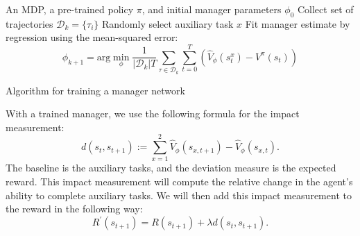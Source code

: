 \documentclass[12pt,A4]{report}
\theoremstyle{definition}
\begin{document}
\begin{algorithm}
\begin{algorithmic}[1]
\Require An MDP, a pre-trained policy $\pi$, and initial manager parameters $\phi_0$
  \State Collect set of trajectories $\mathcal{D}_k = \{\tau_i\}$
  \State Randomly select auxiliary task $x$
  \State Fit manager estimate by regression using the mean-squared error:
  \[ \phi_{k+1} = \text{arg} \min_\phi \frac{1}{|\mathcal{D}_k|T} \sum_{\tau \in \mathcal{D}_k} \sum_{t=0}^T \left( \hat{V}_\phi(s^x_t) - V^\pi (s_t) \right)\]
\EndFor
\end{algorithmic}
\caption{Algorithm for training a manager network}
  \label{alg:manager}
\end{algorithm}






With a trained manager, we use the following formula for the impact measurement:
\[ d(s_t,s_{t+1}) := \sum_{x=1}^2 \hat{V}_\phi(s_{x,t+1}) - \hat{V}_\phi(s_{x,t}).\]
The baseline is the auxiliary tasks, and the deviation measure is the expected reward. This impact measurement will compute the relative change in the agent's ability to complete auxiliary tasks. We will then add this impact measurement to the reward in the following way: 
\[ R^{\prime}(s_{t+1}) = R(s_{t+1}) + \lambda d(s_t,s_{t+1}).\]
\end{document}
